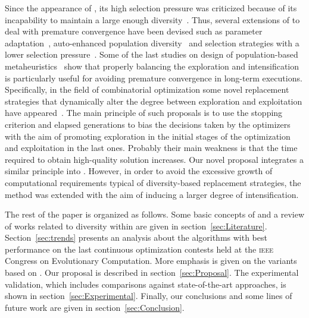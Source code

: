 Since the appearance of \DE{}, its high selection pressure was criticized because of its incapability to maintain a large
enough diversity~\cite{sa2008exploration}.
%
Thus, several extensions of \DE{} to deal with premature convergence have been devised such as parameter adaptation~\cite{zaharie2003control}, 
auto-enhanced population diversity~\cite{yang2015differential} and selection strategies 
with a lower selection pressure~\cite{sa2008exploration}.
%
Some of the last studies on design of population-based metaheuristics~\cite{Crepinsek:13} show that properly balancing the exploration and intensification
is particularly useful for avoiding premature convergence in long-term executions.
%
Specifically, in the field of combinatorial optimization some novel replacement strategies that dynamically alter the degree between exploration and exploitation 
have appeared~\cite{segura2016novel}.
%
The main principle of such proposals is to use the stopping criterion and elapsed generations to bias the decisions taken by the optimizers with the aim
of promoting exploration in the initial stages of the optimization and exploitation in the last ones.
%
Probably their main weakness is that the time required to obtain high-quality solution increases.
%
Our novel proposal integrates a similar principle into \DE{}.
%
However, in order to avoid the excessive growth of computational requirements typical of diversity-based replacement strategies, 
the method was extended with the aim of inducing a larger degree of intensification.

The rest of the paper is organized as follows.
%
Some basic concepts of \DE{} and a review of works related to diversity within \DE{} are given in section~\ref{sec:Literature}.
%
Section~\ref{sec:trends} presents an analysis about the algorithms with best performance on the last continuous optimization 
contests held at the \textsc{ieee} Congress on Evolutionary Computation.
%
More emphasis is given on the variants based on \DE{}.
%
Our proposal is described in section~\ref{sec:Proposal}.
%
The experimental validation, which includes comparisons against state-of-the-art approaches, is shown in section~\ref{sec:Experimental}. 
%
Finally, our conclusions and some lines of future work are given in section~\ref{sec:Conclusion}.
